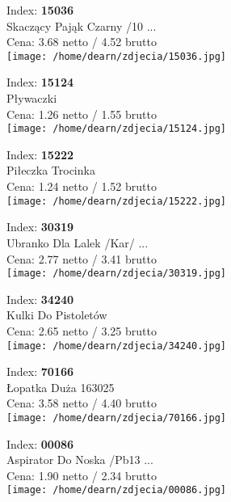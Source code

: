 {Index: \textbf{15036}\\
Skaczący Pająk Czarny /10 ...\\
Cena: 3.68 netto / 4.52 brutto\\
  \texttt{[image: /home/dearn/zdjecia/15036.jpg]}}\newline\newline

{Index: \textbf{15124}\\
Pływaczki\\
Cena: 1.26 netto / 1.55 brutto\\
  \texttt{[image: /home/dearn/zdjecia/15124.jpg]}}\newline\newline

{Index: \textbf{15222}\\
Piłeczka Trocinka\\
Cena: 1.24 netto / 1.52 brutto\\
  \texttt{[image: /home/dearn/zdjecia/15222.jpg]}}\newline\newline

{Index: \textbf{30319}\\
Ubranko Dla Lalek /Kar/   ...\\
Cena: 2.77 netto / 3.41 brutto\\
  \texttt{[image: /home/dearn/zdjecia/30319.jpg]}}\newline\newline

{Index: \textbf{34240}\\
Kulki Do Pistoletów\\
Cena: 2.65 netto / 3.25 brutto\\
  \texttt{[image: /home/dearn/zdjecia/34240.jpg]}}\newline\newline

{Index: \textbf{70166}\\
Łopatka Duża 163025\\
Cena: 3.58 netto / 4.40 brutto\\
  \texttt{[image: /home/dearn/zdjecia/70166.jpg]}}\newline\newline

{Index: \textbf{00086}\\
Aspirator Do Noska  /Pb13 ...\\
Cena: 1.90 netto / 2.34 brutto\\
  \texttt{[image: /home/dearn/zdjecia/00086.jpg]}}\newline\newline


